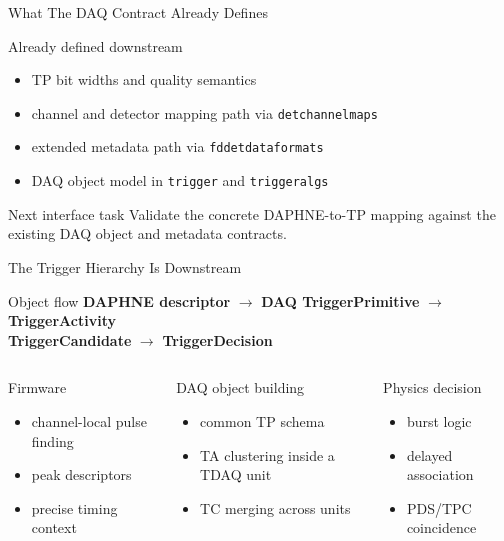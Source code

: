 \documentclass[aspectratio=169]{beamer}
\begin{document}
\begin{frame}{What The DAQ Contract Already Defines}
\small
\begin{block}{Already defined downstream}
\begin{itemize}
  \item TP bit widths and quality semantics
  \item channel and detector mapping path via \texttt{detchannelmaps}
  \item extended metadata path via \texttt{fddetdataformats}
  \item DAQ object model in \texttt{trigger} and \texttt{triggeralgs}
\end{itemize}
\end{block}

\begin{alertblock}{Next interface task}
Validate the concrete DAPHNE-to-TP mapping against the existing DAQ object and metadata contracts.
\end{alertblock}
\end{frame}

\begin{frame}{The Trigger Hierarchy Is Downstream}
\small
\begin{block}{Object flow}
\centering
\textbf{DAPHNE descriptor} \(\rightarrow\) \textbf{DAQ TriggerPrimitive} \(\rightarrow\) \textbf{TriggerActivity}\\[1mm]
\textbf{TriggerCandidate} \(\rightarrow\) \textbf{TriggerDecision}
\end{block}

\begin{columns}[t]
\begin{block}{Firmware}
\begin{itemize}
  \item channel-local pulse finding
  \item peak descriptors
  \item precise timing context
\end{itemize}
\end{block}

\begin{block}{DAQ object building}
\begin{itemize}
  \item common TP schema
  \item TA clustering inside a TDAQ unit
  \item TC merging across units
\end{itemize}
\end{block}

\begin{block}{Physics decision}
\begin{itemize}
  \item burst logic
  \item delayed association
  \item PDS/TPC coincidence
\end{itemize}
\end{block}
\end{columns}
\end{frame}
\end{document}

